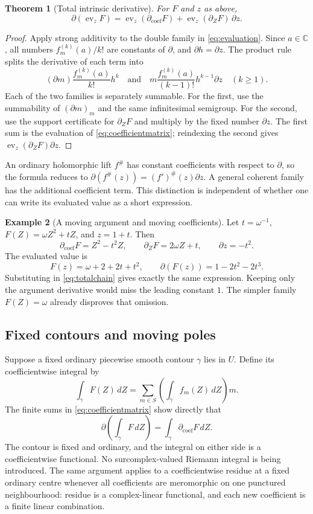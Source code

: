 \documentclass[11pt]{article}
\numberwithin{equation}{section}
\newtheorem{theorem}{Theorem}[section]
\theoremstyle{definition}
\newtheorem{example}[theorem]{Example}
\newcommand{\C}{\mathbb C}
\newcommand{\DD}{\partial}
\newcommand{\Dc}{\partial_{\mathrm{coef}}}
\newcommand{\Dz}{\partial_Z}
\newcommand{\ev}{\operatorname{ev}}
\begin{document}
\begin{theorem}[Total intrinsic derivative]\label{thm:totalchain}
For $F$ and $z$ as above,
\begin{equation}\label{eq:totalchain}
 \DD(\ev_zF)=\ev_z(\Dc F)+\ev_z(\Dz F)\,\DD z.
\end{equation}
\end{theorem}
\begin{proof}
Apply strong additivity to the double family in \eqref{eq:evaluation}.
Since $a\in\C$, all numbers $f_m^{(k)}(a)/k!$ are constants of
$\DD$, and $\DD h=\DD z$. The product rule splits the derivative
of each term into
\[
 (\DD m)\frac{f_m^{(k)}(a)}{k!}h^k
 \quad\text{and}\quad
 m\frac{f_m^{(k)}(a)}{(k-1)!}h^{k-1}\DD z
 \quad(k\ge1).
\]
Each of the two families is separately summable. For the first, use the
summability of $(\DD m)_m$ and the same infinitesimal semigroup. For the
second, use the support certificate for $\Dz F$ and multiply by the
fixed number $\DD z$. The first sum is the evaluation of
\eqref{eq:coefficientmatrix}; reindexing the second gives
$\ev_z(\Dz F)\DD z$.
\end{proof}

An ordinary holomorphic lift $f^\#$ has constant coefficients with respect
to $\DD$, so the formula reduces to
$\DD(f^\#(z))=(f')^\#(z)\DD z$. A general coherent family has the
additional coefficient term. This distinction is independent of whether
one can write its evaluated value as a short expression.

\begin{example}[A moving argument and moving coefficients]
Let $t=\omega^{-1}$, $F(Z)=\omega Z^2+tZ$, and $z=1+t$. Then
\[
 \Dc F=Z^2-t^2Z,\qquad \Dz F=2\omega Z+t,\qquad \DD z=-t^2.
\]
The evaluated value is
\[
 F(z)=\omega+2+2t+t^2,
 \qquad \DD(F(z))=1-2t^2-2t^3.
\]
Substituting in \eqref{eq:totalchain} gives exactly the same expression.
Keeping only the argument derivative would miss the leading constant $1$.
The simpler family $F(Z)=\omega$ already disproves that omission.
\end{example}

\subsection{Fixed contours and moving poles}
Suppose a fixed ordinary piecewise smooth contour $\gamma$ lies in $U$.
Define its coefficientwise integral by
\[
 \int_\gamma F(Z)\,dZ
   =\sum_{m\in S}\left(\int_\gamma f_m(Z)\,dZ\right)m.
\]
The finite sums in \eqref{eq:coefficientmatrix} show directly that
\begin{equation}\label{eq:contourcommutation}
 \DD\!\left(\int_\gamma F\,dZ\right)
       =\int_\gamma\Dc F\,dZ.
\end{equation}
The contour is fixed and ordinary, and the integral on either side is a
coefficientwise functional. No surcomplex-valued Riemann integral is
being introduced. The same argument applies to a coefficientwise residue
at a fixed ordinary centre whenever all coefficients are meromorphic on
one punctured neighbourhood: residue is a complex-linear functional, and
each new coefficient is a finite linear combination.
\end{document}
